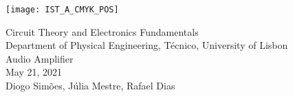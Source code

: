 
\thispagestyle {empty}

\texttt{[image: IST\_A\_CMYK\_POS]}

\begin{center}
%
\vspace{1.0cm}

\vspace{1cm}
{\FontLb Circuit Theory and Electronics Fundamentals} \\ %
\vspace{1cm}
{\FontSn Department of Physical Engineering, Técnico, University of Lisbon} \\ %
\vspace{1cm}
{\FontSn Audio Amplifier } \\
\vspace{1cm}
{\FontSn May 21, 2021} \\ %
{\FontSn Diogo Simões, Júlia Mestre, Rafael Dias}
\end{center}

